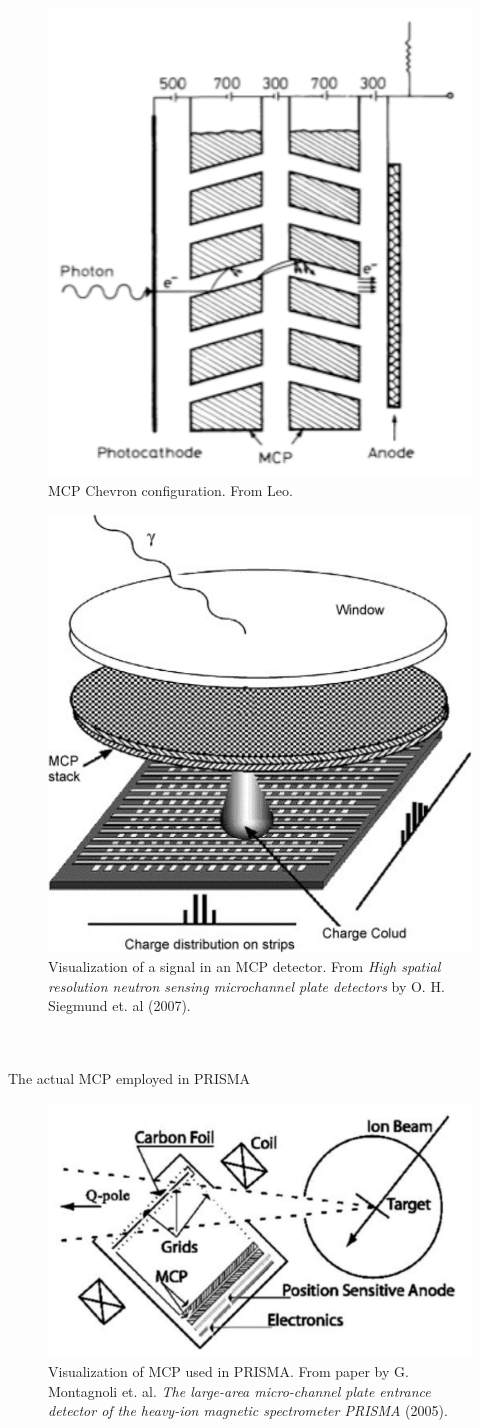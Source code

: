 \documentclass{article}
\begin{document}
\begin{figure}[htbp!]
    \centering
    \includegraphics[width=0.4\linewidth]{Figures/PRISMA/MCP/MCPChevron.pdf}
    \caption{MCP Chevron configuration. From Leo.}
    \label{fig:MCPChevron}
\end{figure}
\begin{figure}[htbp!]
    \centering
    \includegraphics[width=0.5\linewidth]{Figures/PRISMA/MCP/MCPSignal.pdf}
    \caption{Visualization of a signal in an MCP detector. From \emph{High spatial resolution neutron sensing microchannel plate detectors} by O. H. Siegmund et. al (2007).}
    \label{fig:MCPSignal}
\end{figure}
\\\\
The actual MCP employed in PRISMA 
\begin{figure}[htbp!]
    \centering
    \includegraphics[width=0.5\linewidth]{Figures/PRISMA/MCP/MCPPrisma.pdf}
    \caption{Visualization of MCP used in PRISMA. From paper by G. Montagnoli et. al. \emph{The large-area micro-channel plate entrance detector of the heavy-ion magnetic spectrometer PRISMA} (2005).}
    \label{fig:MCPPrisma}
\end{figure}
\end{document}
